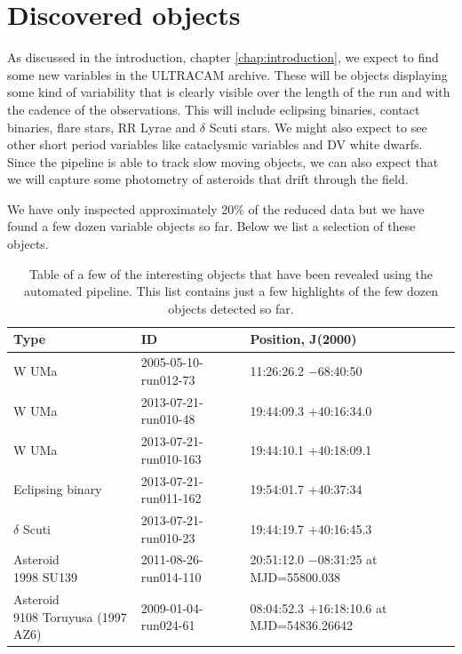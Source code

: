 \section{Discovered objects}
As discussed in the introduction, chapter \ref{chap:introduction}, we expect to find some new variables in the ULTRACAM archive. These will be objects displaying some kind of variability that is clearly visible over the length of the run and with the cadence of the observations. This will include eclipsing binaries, contact binaries, flare stars, RR Lyrae and $\delta$ Scuti stars. We might also expect to see other short period variables like cataclysmic variables and DV white dwarfs. Since the pipeline is able to track slow moving objects, we can also expect that we will capture some photometry of asteroids that drift through the field.   

We have only inspected approximately 20\% of the reduced data but we have found a few dozen variable objects so far. Below we list a selection of these objects. 

\begin{table}
  \caption{Table of a few of the interesting objects that have been revealed using the automated pipeline. This list contains just a few highlights of the few dozen objects detected so far.}
  \begin{tabularx}{15.4cm}{ l  l  l }
  \hline
  Type& ID & Position, J(2000) \\
  \hline
    {W UMa} & 2005-05-10-run012-73 & 11:26:26.2 $-68$:40:50 \\
    {W UMa} & 2013-07-21-run010-48 & 19:44:09.3 $+40$:16:34.0\\
    {W UMa} & 2013-07-21-run010-163 & 19:44:10.1 $+40$:18:09.1\\
    Eclipsing binary & 2013-07-21-run011-162 & 19:54:01.7 $+40$:37:34\\
    $\delta$ Scuti & 2013-07-21-run010-23 & 19:44:19.7 $+40$:16:45.3\\
  \hline
    \parbox[c]{5cm}{Asteroid\\1998 SU139\\ } & \parbox[c]{5cm}{2011-08-26-run014-110\\  } & \parbox[c]{5cm}{20:51:12.0 $-08$:31:25\\ at MJD=55800.038}\\
    \parbox[c]{5cm}{Asteroid\\9108 Toruyusa (1997 AZ6) } & \parbox[c]{5cm}{2009-01-04-run024-61\\}& \parbox[c]{5cm}{08:04:52.3 $+16$:18:10.6\\at  MJD=54836.26642}\\

  \hline
  \end{tabularx}
  \label{tab:newobjects}
\end{table}


